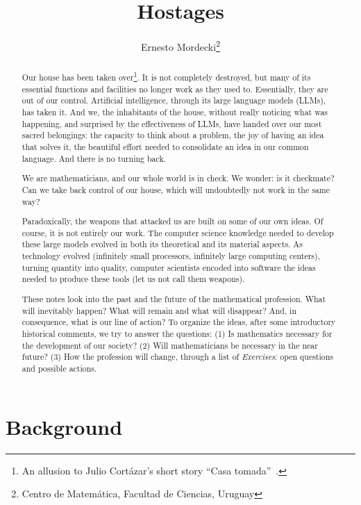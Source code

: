 \documentclass[12pt]{article}
\title{Hostages}
\author{Ernesto Mordecki\footnote{Centro de Matemática, Facultad de Ciencias, Uruguay}}
\begin{document}
\maketitle
\begin{abstract}
Our house has been taken over\footnote{An allusion to Julio Cortázar's short
	story ``Casa tomada''~\cite{Cortazar1951}.}.
It is not completely destroyed, but many of its essential functions and
facilities no longer work as they used to. Essentially, they are out of our
control. Artificial intelligence, through its large language models (LLMs), has
taken it.
And we, the inhabitants of the house,
without really noticing what was happening, and surprised by the effectiveness of LLMs,
have handed over our most sacred belongings: the capacity to think
about a problem, the joy of having an idea that solves it, the
beautiful effort needed to consolidate an idea in our common language.
And there is no turning back.

We are mathematicians, and our whole world is in check.
%
We wonder: is it checkmate? Can we take back control of our house, which will
undoubtedly not work in the same way?

Paradoxically, the weapons that attacked us are built on some of our own ideas.
Of course, it is not entirely our work.
The computer science knowledge needed to develop these large models evolved
in both its theoretical and its material aspects.
As technology evolved (infinitely small processors, infinitely large computing centers),
turning quantity into quality,
computer scientists encoded into software the ideas needed to produce these tools
(let us not call them weapons).

These notes look into the past and the future of the mathematical profession.
What will inevitably happen?
What will remain and what will disappear?
And, in consequence,
what is our line of action?
To organize the ideas, after some introductory historical comments, we try to answer the questions:
(1) Is mathematics necessary for the development of our society?
(2) Will mathematicians be necessary in the near future?
(3) How the profession will change, through a list of \emph{Exercises}: open questions and possible actions.
\end{abstract}

\section{Background}
\end{document}
